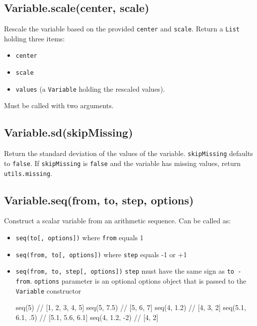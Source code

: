 \documentclass{article}
\begin{document}
    \subsection{Variable.scale(center, scale)}
    Rescale the variable based on the provided \texttt{center} and \texttt{scale}.
Return a \texttt{List} holding three items:


\begin{itemize}

\item \texttt{center}

\item \texttt{scale}

\item \texttt{values} (a \texttt{Variable} holding the rescaled values).

\end{itemize}

Must be called with two arguments.


    \subsection{Variable.sd(skipMissing)}
    Return the standard deviation of the values of the variable.
\texttt{skipMissing} defaults to \texttt{false}.  If \texttt{skipMissing} is \texttt{false} and
the variable has missing values, return \texttt{utils.missing}.


    \subsection{Variable.seq(from, to, step, options)}
    Construct a scalar variable from an arithmetic sequence.
Can be called as:


\begin{itemize}

\item \texttt{seq(to[, options])} where \texttt{from} equals 1

\item \texttt{seq(from, to[, options])} where \texttt{step} equals -1 or +1

\item \texttt{seq(from, to, step[, options])}
\texttt{step} must have the same sign as \texttt{to - from}.
\texttt{options} parameter is an optional options object that is passed to the
\texttt{Variable} constructor


  seq(5)            // [1, 2, 3, 4, 5]
  seq(5, 7.5)       // [5, 6, 7]
  seq(4, 1.2)       // [4, 3, 2]
  seq(5.1, 6.1, .5) // [5.1, 5.6, 6.1]
  seq(4, 1.2, -2)   // [4, 2]




\end{itemize}
\end{document}
